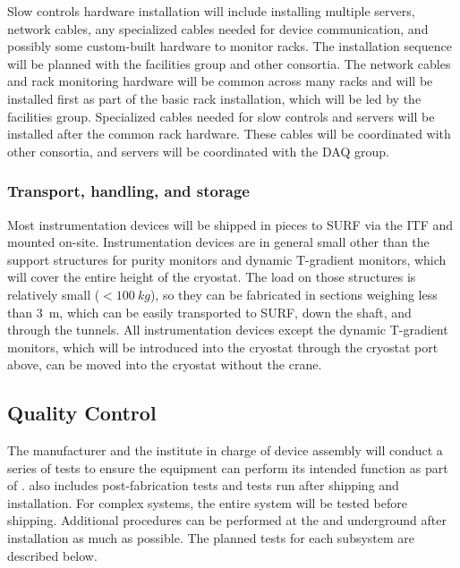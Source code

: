 Slow controls hardware installation will include installing multiple
servers, network cables, any specialized cables needed
for device communication, and possibly some custom-built hardware to monitor racks. The installation sequence will be 
planned with the facilities group and other consortia. The network
cables and rack monitoring hardware will be common across many racks
and will be installed first as part of the basic rack installation, which
will be led by the facilities group. Specialized cables needed for slow controls and servers will be installed
after the common rack hardware. These cables will be coordinated
with other consortia, and servers will be coordinated with the DAQ group.

\subsubsection{Transport, handling, and storage}
\label{sec:fdgen-slow-cryo-install-transport}


Most instrumentation devices will be shipped in pieces to SURF via the ITF and mounted on-site. 
Instrumentation devices are in general small other than the support structures for purity monitors and dynamic T-gradient monitors,
which will cover the entire height of the cryostat. The load on those structures is relatively small (\(<\SI{100}{kg}\)), so they can be fabricated in sections weighing less than \SI{3}{m},
which can be easily transported to SURF, down the shaft, and through the tunnels.
All instrumentation devices except the dynamic T-gradient monitors, which will be introduced into the cryostat through the cryostat port above, can be
moved into the cryostat without the crane. 


\subsection{Quality Control}
\label{sec:fdsp-slow-cryo-qc}
The manufacturer and the institute in charge of device assembly will conduct a series of tests to ensure the equipment can perform its intended function as part of .  also includes post-fabrication tests and tests run after shipping and installation. For complex systems, the entire system will be tested before shipping. 
Additional  procedures can be performed at the  and underground after installation as much as possible. The planned tests for each subsystem are described below.  

